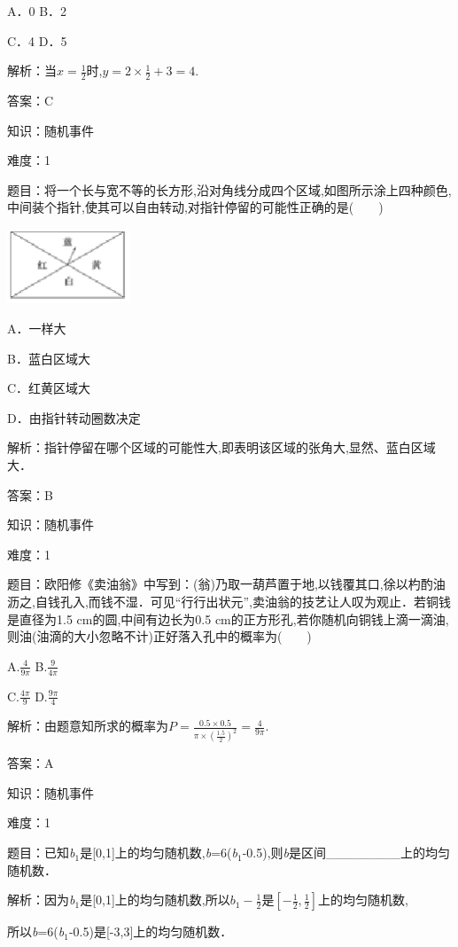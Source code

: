 \documentclass{article} %
\begin{document}
A．0  B．2

C．4  D．5

解析：当$x=\frac{1}{2}$时,$y=2\times\frac{1}{2}+3=4$.

答案：C

知识：随机事件

难度：1

题目：将一个长与宽不等的长方形,沿对角线分成四个区域,如图所示涂上四种颜色,中间装个指针,使其可以自由转动,对指针停留的可能性正确的是(　　)

\includegraphics*[width=1.44in, height=0.88in, keepaspectratio=false]{image108}

A．一样大

B．蓝白区域大

C．红黄区域大

D．由指针转动圈数决定

解析：指针停留在哪个区域的可能性大,即表明该区域的张角大,显然、蓝白区域大．

答案：B

知识：随机事件

难度：1

题目：欧阳修《卖油翁》中写到：(翁)乃取一葫芦置于地,以钱覆其口,徐以杓酌油沥之,自钱孔入,而钱不湿．可见``行行出状元'',卖油翁的技艺让人叹为观止．若铜钱是直径为1.5 cm的圆,中间有边长为0.5 cm的正方形孔,若你随机向铜钱上滴一滴油,则油(油滴的大小忽略不计)正好落入孔中的概率为(　　)

A.$\frac{4}{9\pi}$  B.$\frac{9}{4\pi}$

C.$\frac{4\pi}{9}$  D.$\frac{9\pi}{4}$

解析：由题意知所求的概率为$P=\frac{0.5\times0.5}{\pi\times(\frac{1.5}{2})^2}=\frac{4}{9\pi}$.

答案：A

知识：随机事件

难度：1

题目：已知\textit{b}${}_{1}$是[0,1]上的均匀随机数,\textit{b}=6(\textit{b}${}_{1}$-0.5),则\textit{b}是区间\_\_\_\_\_\_\_\_上的均匀随机数．

解析：因为\textit{b}${}_{1}$是[0,1]上的均匀随机数,所以$b_1-\frac{1}{2}$是$\left[-\frac{1}{2},\frac{1}{2}\right]$上的均匀随机数,

所以\textit{b}=6(\textit{b}${}_{1}$-0.5)是[-3,3]上的均匀随机数．
\end{document}
